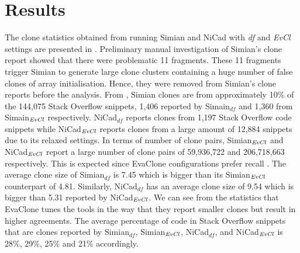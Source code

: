 \documentclass{sig-alternate-05-2015}
\begin{document}
\section{Results}

\begin{table}
	\centering
	\caption{Statistics of clones found between Stack Overflow and Qualitas projects using Simian and NiCad}
	\label{tab:raw_stats}
	\small
\end{table}

The clone statistics obtained from running Simian and NiCad with \textit{df} and \textit{EvCl} settings are presented in . Preliminary manual investigation of Simian's clone report showed that there were problematic 11 fragments. These 11 fragments trigger Simian to generate large clone clusters containing a huge number of false clones of array initialisation. Hence, they were removed from Simian's clone reports before the analysis. From , Simian clones are from approximately 10\% of the 144,075 Stack Overflow snippets, 1,406 reported by Simain$_{df}$ and 1,360 from Simain$_{\textrm{\textit{EvCl}}}$ respectively. NiCad$_{df}$ reports clones from 1,197 Stack Overflow code snippets while NiCad$_{\textrm{\textit{EvCl}}}$ reports clones from a large amount of 12,884 snippets due to its relaxed settings. In terms of number of clone pairs, Simian$_{\textrm{\textit{EvCl}}}$ and NiCad$_{\textrm{\textit{EvCl}}}$ report a large number of clone pairs of 59,936,722 and 206,718,663 respectively. This is expected since EvaClone configurations prefer recall \cite{Wang2013}. The average clone size of Simian$_{df}$ is 7.45 which is bigger than its Simian$_{\textrm{\textit{EvCl}}}$ counterpart of 4.81. Similarly, NiCad$_{df}$ has an average clone size of 9.54 which is bigger than 5.31 reported by NiCad$_{\textrm{\textit{EvCl}}}$. We can see from the statistics that EvaClone tunes the tools in the way that they report smaller clones but result in higher agreements. The average percentage of code in Stack Overflow snippets that are clones reported by Simian$_{df}$, Simian$_{\textrm{\textit{EvCl}}}$, NiCad$_{df}$, and NiCad$_{\textrm{\textit{EvCl}}}$ is 28\%, 29\%, 25\% and 21\% accordingly.
\end{document}
